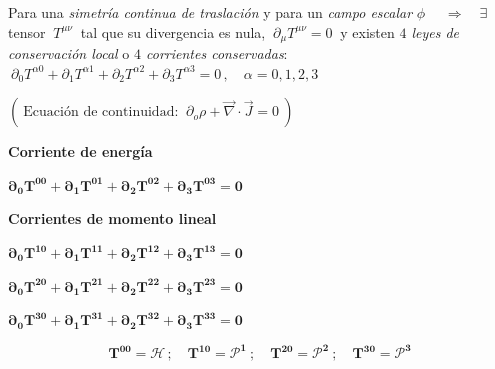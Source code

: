 Para una \emph{simetría continua de traslación} y para un \emph{campo escalar} $\phi$ $\quad \Rightarrow \quad \exists $ tensor $\ T^{\mu \nu} \ $ tal que su divergencia es nula, $\ \partial_\mu T^{\mu \nu} = 0\ $ y existen \emph{$4$ leyes de conservación local} o \emph{$4$ corrientes conservadas}: $\ \partial_0 T^{\alpha 0}+ \partial_1 T^{\alpha 1}+ \partial_2 T^{\alpha 2}+ \partial_3 T^{\alpha 3} =0 \, ,  \quad \alpha=0,1,2,3$ 

\textcolor{gris}{$( \ \text{Ecuación de continuidad: } \ \partial_o \rho + \overrightarrow \nabla \cdot \vec J = 0 \ ) $}


\vspace{1cm}
\begin{adjustwidth}{60pt}{60pt}
\begin{destacado}
\vspace{2mm}

\color{NavyBlue}
\hspace{.5cm}\textbf{Corriente de energía}

\hspace{1cm} $\boldsymbol{ \partial_0 T^{0 0}+ \partial_1 T^{0 1}+ \partial_2 T^{02}+ \partial_3 T^{03} =0}$


\hspace{.5cm}\textbf{Corrientes de momento lineal}

\hspace{1cm} $\boldsymbol{ \partial_0 T^{10}+ \partial_1 T^{11}+ \partial_2 T^{12}+ \partial_3 T^{13} =0}$


\hspace{1cm} $\boldsymbol{ \partial_0 T^{20}+ \partial_1 T^{21}+ \partial_2 T^{22}+ \partial_3 T^{23} =0}$

\hspace{1cm} $\boldsymbol{ \partial_0 T^{30}+ \partial_1 T^{31}+ \partial_2 T^{32}+ \partial_3 T^{33} =0}$

$$\boldsymbol{ T^{00}=\mathcal H \, ; \quad T^{10}=\mathcal P^1 \ ; \quad  T^{20}=\mathcal P^2 \ ; \quad T^{30}=\mathcal P^3 }$$



\vspace{2mm}
\end{destacado}
\end{adjustwidth}
\color{black} 

